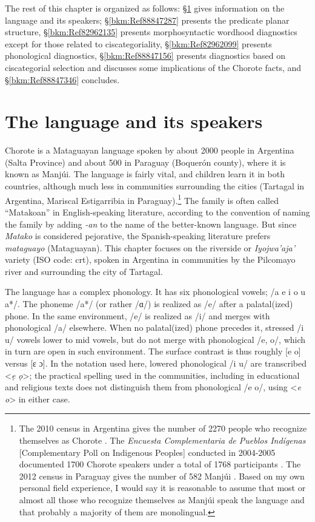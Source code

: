 \documentclass[output=paper]{langscibook}
\begin{document}
The rest of this chapter is organized as follows: §\ref{cho:sec:languageandspeakers} gives information on the language and its speakers; §\ref{bkm:Ref88847287} presents the predicate planar structure, §\ref{bkm:Ref82962135} presents morphosyntactic wordhood diagnostics except for those related to ciscategoriality, §\ref{bkm:Ref82962099} presents phonological diagnostics, §\ref{bkm:Ref88847156} presents diagnostics based on ciscategorial selection and discusses some implications of the Chorote facts, and §\ref{bkm:Ref88847346} concludes.

\largerpage
\section{The language and its speakers}
\label{cho:sec:languageandspeakers}
Chorote is a Mataguayan language spoken by about 2000 people in Argentina (Salta Province) and about 500 in Paraguay (Boquerón county), where it is known as Manjúi. The language is fairly vital, and children learn it in both countries, although much less in communities surrounding the cities (Tartagal in Argentina, Mariscal Estigarribia in Paraguay).\footnote{The 2010 census in Argentina gives the number of 2270 people who recognize themselves as Chorote \citep{INDEC2012}. The \textit{Encuesta Complementaria de Pueblos Indígenas} [Complementary Poll on Indigenous Peoples] conducted in 2004-2005 documented 1700 Chorote speakers under a total of 1768 participants \citep{INDEC2005}. The 2012 census in Paraguay gives the number of 582 Manjúi \citep{DGEEC2012}. Based on my own personal field experience, I would say it is reasonable to assume that most or almost all those who recognize themselves as Manjúi speak the language and that probably a majority of them are monolingual.} The family is often called ``Matakoan'' in English-speaking literature, according to the convention of naming the family by adding \textit{-an} to the name of the better-known language. But since \textit{Matako} is considered pejorative, the Spanish-speaking literature prefers \textit{mataguayo} (Mataguayan). This chapter focuses on the riverside or \textit{Iyojwa'aja'} variety (ISO code: crt), spoken in Argentina in communities by the Pilcomayo river and surrounding the city of Tartagal.

The language has a complex phonology. It has six phonological vowels; /a e i o u a*/. The phoneme /a*/ (or rather /ɑ/) is realized as /e/ after a palatal(ized) phone. In the same environment, /e/ is realized as /i/ and merges with phonological /a/ elsewhere. When no palatal(ized) phone precedes it, stressed /i u/ vowels lower to mid vowels, but do not merge with phonological /e, o/, which in turn are open in such environment. The surface contrast is thus roughly [e o] versus [ɛ ɔ]. In the notation used here, lowered phonological /i u/ are transcribed <\textit{ẹ ọ}>; the practical spelling used in the communities, including in educational and religious texts does not distinguish them from phonological /e o/, using <\textit{e o}> in either case.
\end{document}
